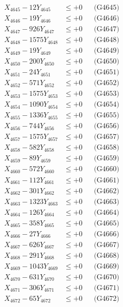 \documentclass[a4paper,10pt]{article}
\begin{document}
{\begin{align}
X_{4645} - 12Y_{4645} &\leq +0 && \text{(G4645)} \\
X_{4646} - 19Y_{4646} &\leq +0 && \text{(G4646)} \\
X_{4647} - 926Y_{4647} &\leq +0 && \text{(G4647)} \\
X_{4648} - 1575Y_{4648} &\leq +0 && \text{(G4648)} \\
X_{4649} - 19Y_{4649} &\leq +0 && \text{(G4649)} \\
X_{4650} - 200Y_{4650} &\leq +0 && \text{(G4650)} \\
\allowbreak
X_{4651} - 24Y_{4651} &\leq +0 && \text{(G4651)} \\
X_{4652} - 571Y_{4652} &\leq +0 && \text{(G4652)} \\
X_{4653} - 1575Y_{4653} &\leq +0 && \text{(G4653)} \\
X_{4654} - 1090Y_{4654} &\leq +0 && \text{(G4654)} \\
X_{4655} - 1336Y_{4655} &\leq +0 && \text{(G4655)} \\
X_{4656} - 744Y_{4656} &\leq +0 && \text{(G4656)} \\
X_{4657} - 1575Y_{4657} &\leq +0 && \text{(G4657)} \\
X_{4658} - 582Y_{4658} &\leq +0 && \text{(G4658)} \\
X_{4659} - 89Y_{4659} &\leq +0 && \text{(G4659)} \\
X_{4660} - 572Y_{4660} &\leq +0 && \text{(G4660)} \\
\allowbreak
X_{4661} - 112Y_{4661} &\leq +0 && \text{(G4661)} \\
X_{4662} - 301Y_{4662} &\leq +0 && \text{(G4662)} \\
X_{4663} - 1323Y_{4663} &\leq +0 && \text{(G4663)} \\
X_{4664} - 126Y_{4664} &\leq +0 && \text{(G4664)} \\
X_{4665} - 358Y_{4665} &\leq +0 && \text{(G4665)} \\
X_{4666} - 27Y_{4666} &\leq +0 && \text{(G4666)} \\
X_{4667} - 626Y_{4667} &\leq +0 && \text{(G4667)} \\
X_{4668} - 291Y_{4668} &\leq +0 && \text{(G4668)} \\
X_{4669} - 1043Y_{4669} &\leq +0 && \text{(G4669)} \\
X_{4670} - 631Y_{4670} &\leq +0 && \text{(G4670)} \\
\allowbreak
X_{4671} - 306Y_{4671} &\leq +0 && \text{(G4671)} \\
X_{4672} - 65Y_{4672} &\leq +0 && \text{(G4672)} \\

\end{align}}
\end{document}
